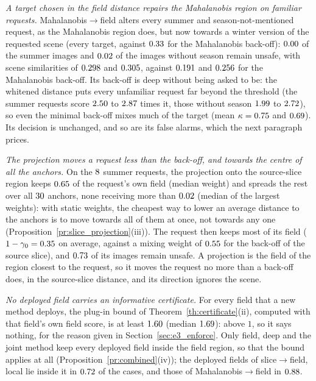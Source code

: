 \documentclass{article}
\theoremstyle{plain}
\theoremstyle{remark}
\begin{document}
\emph{A target chosen in the field distance repairs the Mahalanobis region on familiar requests.} Mahalanobis$\to$field alters every
summer and season-not-mentioned request, as the Mahalanobis region does, but now towards a winter version of the requested scene
(every target, against $0.33$ for the Mahalanobis back-off): $0.00$ of the summer images and $0.02$ of the
images without season remain unsafe, with scene similarities of $0.298$ and $0.305$, against $0.191$ and
$0.256$ for the Mahalanobis back-off. Its back-off is deep without being asked to be: the whitened distance puts every
unfamiliar request far beyond the threshold (the summer requests score $2.50$ to $2.87$ times it, those
without season $1.99$ to $2.72$), so even the minimal back-off mixes much of the target (mean
$\kappa=0.75$ and $0.69$). Its decision is unchanged, and so are its false alarms, which the next paragraph prices.

\emph{The projection moves a request less than the back-off, and towards the centre of all the anchors.} On the $8$ summer
requests, the projection onto the source-slice region keeps $0.65$ of the request's own field (median weight) and spreads
the rest over all $30$ anchors, none receiving more than $0.02$ (median of the largest weights): with static
weights, the cheapest way to lower an average distance to the anchors is to move towards all of them at once, not towards any
one (Proposition~\ref{pr:slice_projection}(iii)). The request then keeps most of its field ($1-\gamma_0=0.35$ on average, against a mixing weight of $0.55$ for
the back-off of the source slice), and $0.73$ of its images remain unsafe. A projection is the field of the region closest
to the request, so it moves the request no more than a back-off does, in the source-slice distance, and its direction ignores the
scene.

\emph{No deployed field carries an informative certificate.} For every field that a new method deploys, the plug-in bound of
Theorem~\ref{th:certificate}(ii), computed with that field's own field score, is at least $1.60$ (median
$1.69$): above $1$, so it says nothing, for the reason given in Section~\ref{sec:e3_enforce}. Only field, deep and the joint
method keep every deployed field inside the field region, so that the bound applies at all (Proposition~\ref{pr:combined}(iv)); the
deployed fields of slice$\to$field, local lie inside it in $0.72$ of the cases, and those of Mahalanobis$\to$field in
$0.88$.
\end{document}
